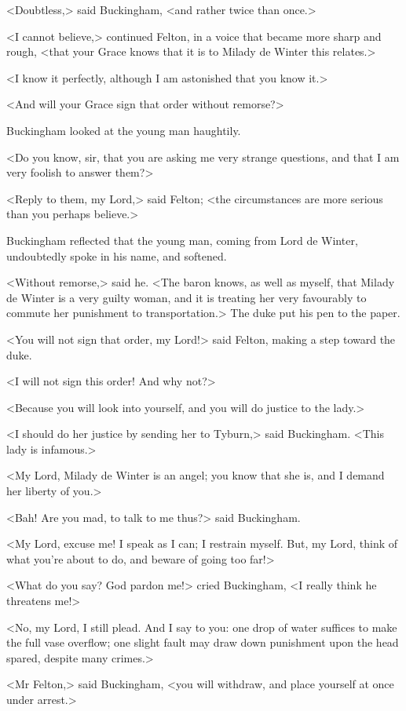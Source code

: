 <Doubtless,> said Buckingham, <and rather twice than once.> 

<I cannot believe,> continued Felton, in a voice that became more sharp and rough, <that your Grace knows that it is to Milady de Winter this relates.> 

<I know it perfectly, although I am astonished that you know it.> 

<And will your Grace sign that order without remorse?> 

Buckingham looked at the young man haughtily. 

<Do you know, sir, that you are asking me very strange questions, and that I am very foolish to answer them?> 

<Reply to them, my Lord,> said Felton; <the circumstances are more serious than you perhaps believe.> 

Buckingham reflected that the young man, coming from Lord de Winter, undoubtedly spoke in his name, and softened. 

<Without remorse,> said he. <The baron knows, as well as myself, that Milady de Winter is a very guilty woman, and it is treating her very favourably to commute her punishment to transportation.> The duke put his pen to the paper. 

<You will not sign that order, my Lord!> said Felton, making a step toward the duke. 

<I will not sign this order! And why not?> 

<Because you will look into yourself, and you will do justice to the lady.> 

<I should do her justice by sending her to Tyburn,> said Buckingham. <This lady is infamous.> 

<My Lord, Milady de Winter is an angel; you know that she is, and I demand her liberty of you.> 

<Bah! Are you mad, to talk to me thus?> said Buckingham. 

<My Lord, excuse me! I speak as I can; I restrain myself. But, my Lord, think of what you're about to do, and beware of going too far!> 

<What do you say? God pardon me!> cried Buckingham, <I really think he threatens me!> 

<No, my Lord, I still plead. And I say to you: one drop of water suffices to make the full vase overflow; one slight fault may draw down punishment upon the head spared, despite many crimes.> 

<Mr Felton,> said Buckingham, <you will withdraw, and place yourself at once under arrest.> 

